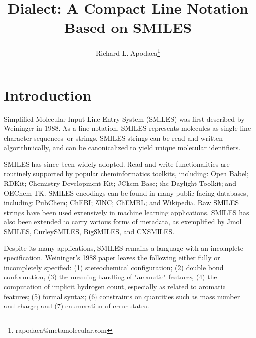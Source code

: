 \documentclass{article}
\begin{document}
\lstset{basicstyle=\ttfamily,breaklines=true}


\title{Dialect: A Compact Line Notation Based on SMILES}
\author{Richard L. Apodaca\thanks{rapodaca@metamolecular.com}}

\maketitle

\section*{Introduction}

Simplified Molecular Input Line Entry System (SMILES) was first described by Weininger in 1988.\cite{weininger:1988} As a line notation,\cite{wiswesser:1968} SMILES represents molecules as single line character sequences, or strings. SMILES strings can be read and written algorithmically, and can be canonicalized\cite{weininger:1989,oBoyle:2012} to yield unique molecular identifiers.

SMILES has since been widely adopted. Read and write functionalities are routinely supported by popular cheminformatics toolkits, including: Open Babel;\cite{oBoyle:2011} RDKit;\cite{rdkit} Chemistry Development Kit;\cite{steinbeck:2003} JChem Base;\cite{jchemBase} the Daylight Toolkit;\cite{daylightToolkit} and OEChem TK.\cite{oetk} SMILES encodings can be found in many public-facing databases, including: PubChem;\cite{kim:2016} ChEBI;\cite{degtyarenko:2007} ZINC;\cite{irwin:2005} ChEMBL;\cite{gaulton:2012} and Wikipedia.\cite{wikipediaCAS} Raw SMILES strings have been used extensively in machine learning applications.\cite{sousa:2021} SMILES has also been extended to carry various forms of metadata, as exemplified by Jmol SMILES,\cite{hanson:2016} CurleySMILES,\cite{drefahl:2011} BigSMILES,\cite{lin:2019} and CXSMILES.\cite{cxsmiles}

Despite its many applications, SMILES remains a language with an incomplete specification. Weininger's 1988 paper leaves the following either fully or incompletely specified: (1) stereochemical configuration; (2) double bond conformation; (3) the meaning handling of "aromatic" features; (4) the computation of implicit hydrogen count, especially as related to aromatic features; (5) formal syntax; (6) constraints on quantities such as mass number and charge; and (7) enumeration of error states.
\end{document}
